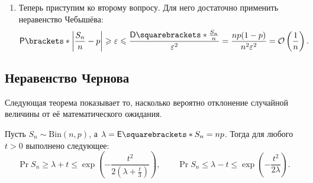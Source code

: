 \begin{enumerate}
    
    
    \item Теперь приступим ко второму вопросу. Для него достаточно применить неравенство Чебышёва:
    \[\Pr{\left|\frac{S_n}{n}-p\right| \geq \epsilon} \leq \frac{\D{\frac{S_n}{n}}}{\epsilon^2} =
    \frac{np(1 - p)}{n^2\epsilon^2} = \mathcal{O}\left(\frac{1}{n}\right).\]
\end{enumerate}

\subsection{Неравенство Чернова}
Следующая теорема показывает то, насколько вероятно отклонение случайной величины от её математического ожидания.
\begin{theorem}
    Пусть \(S_n \sim \mathrm{Bin}(n, p)\), а \(\lambda = \E{S_n} = np\). Тогда для любого \(t > 0\) выполнено следующее:
    \[\Pr{S_n \geq \lambda + t} \leq \exp\left( -\frac{t^2}{2(\lambda + \frac{t}{3})} \right), \qquad\Pr{S_n \leq \lambda - t} \leq \exp\left( -\frac{t^2}{2\lambda} \right).\]
\end{theorem}
